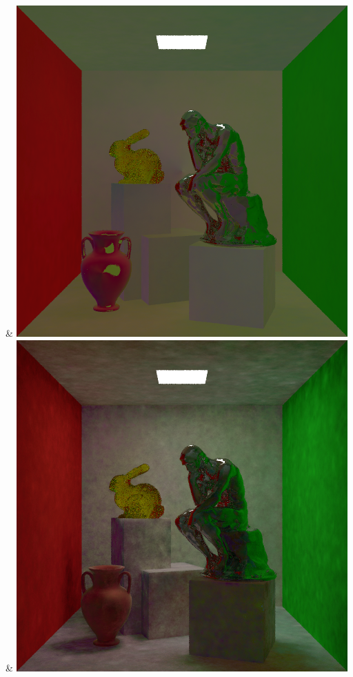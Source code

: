 & \includegraphics[width=\linewidth]{figures/py/tests/batch_size/5+nrc+pt+16@4_1spp.png}
& \includegraphics[width=\linewidth]{figures/py/tests/batch_size/25+nrc+pt+16@4_1spp.png}
